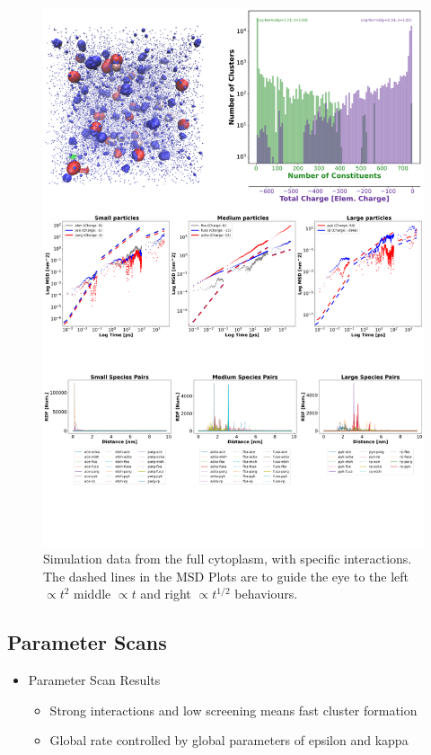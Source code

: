 \documentclass[a4paper,11pt,oneside]{book}
\begin{document}
\begin{figure}[!htbp]
\centering
\includegraphics[width=0.7\linewidth]{files/Fig8-efc86aafad27c0dca716926433b3ab15.png}
\caption[]{Simulation data from the full cytoplasm, with specific interactions. The dashed lines in the MSD Plots are to guide the eye to the left $\propto t^2$ middle $\propto t$ and right $\propto t^{1/2}$ behaviours.}
\label{Fig8_CytoSys}
\end{figure}

\subsection{Parameter Scans}

\begin{itemize}
\item Parameter Scan Results\begin{itemize}
\item Strong interactions and low screening means fast cluster formation
\item Global rate controlled by global parameters of epsilon and kappa
\end{itemize}
\end{itemize}
\end{document}

